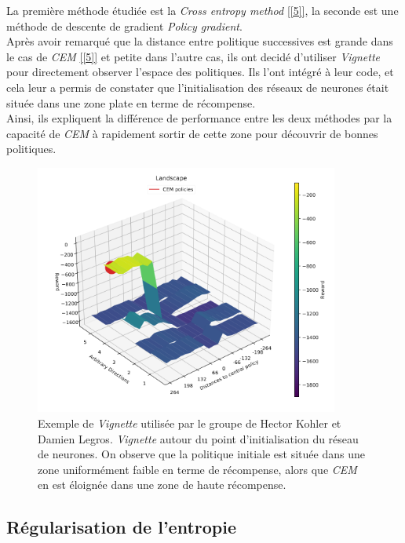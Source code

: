 \documentclass[12pt]{article}
\begin{document}
La première méthode étudiée est la \emph{Cross entropy method} \ref{[5]}, la seconde est une méthode de descente de gradient \emph{Policy gradient}. \\

Après avoir remarqué que la distance entre politique successives est grande dans le cas de \emph{CEM} \ref{[5]} et petite dans l'autre cas, ils ont decidé d'utiliser \emph{Vignette} pour directement observer l'espace des politiques. Ils l'ont intégré à leur code, et cela leur a permis de constater que l'initialisation des réseaux de neurones était située dans une zone plate en terme de récompense. \\

Ainsi, ils expliquent la différence de performance entre les deux méthodes par la capacité de \emph{CEM} à rapidement sortir de cette zone pour découvrir de bonnes politiques. \\

\begin{figure}[htp]
    \centering
    \includegraphics[width=10cm]{Images/cem_example}
    \caption{Exemple de \emph{Vignette} utilisée par le groupe de Hector Kohler et Damien Legros. \emph{Vignette} autour du point d'initialisation du réseau de neurones. On observe que la politique initiale est située dans une zone uniformément faible en terme de récompense, alors que \emph{CEM} en est éloignée dans une zone de haute récompense.}
    \label{fig:cemExample}
\end{figure}

\subsection{Régularisation de l'entropie}
\end{document}
